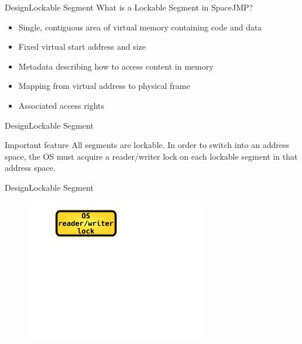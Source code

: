 \documentclass[10pt]{beamer}
\begin{document}
\begin{frame}{Design}{Lockable Segment}
  What is a Lockable Segment in SpaceJMP? \pause
  \begin{itemize}
    \item Single, contiguous area of virtual memory containing code and data \pause
    \item Fixed virtual start address and size \pause
    \item Metadata describing how to access content in memory \pause
    \item Mapping from virtual address to physical frame \pause
    \item Associated access rights
  \end{itemize}
\end{frame}

\begin{frame}{Design}{Lockable Segment}
  \begin{block}{Important feature}
    All segments are lockable. In order to switch into an address space, the OS
    must acquire a reader/writer lock on each lockable segment in that address
    space.
  \end{block}
\end{frame}

\begin{frame}{Design}{Lockable Segment}
  \begin{figure}[ht]
    \centering
    \includegraphics[width=0.7\textwidth, keepaspectratio=true]{images/lockable_segment_a.png}
  \end{figure}
\end{frame}
\end{document}
